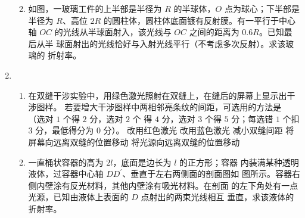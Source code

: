 \begin{enumerate}
\begin{enumerate}

\item 
如图，一玻璃工件的上半部是半径为 $ R $ 的半球体，$ O $ 点为球心；下半部是半径为
$ R $、高位 $ 2R $ 的圆柱体，圆柱体底面镀有反射膜。有一平行于中心轴 $ OC $
的光线从半球面射入，该光线与 $ OC $ 之间的距离为 $ 0.6R $。已知最后从半
球面射出的光线恰好与入射光线平行（不考虑多次反射）。求该玻璃的
折射率。
\begin{figure}[h!]
	\flushright
	
\end{figure}




\end{enumerate}


\item 
{}
\begin{enumerate}
	\item
在双缝干涉实验中，用绿色激光照射在双缝上，在缝后的屏幕上显示出干涉图样。
若要增大干涉图样中两相邻亮条纹的间距，可选用的方法是 \underlinegap （选对 $ 1 $ 个得 $ 2 $ 分，选对 $ 2 $ 个
得 $ 4 $ 分，选对 $ 3 $ 个得 $ 5 $ 分；每选错 $ 1 $ 个扣 $ 3 $ 分，最低得分为 $ 0 $ 分）。
\fivechoices
{改用红色激光}
{改用蓝色激光}
{减小双缝间距}
{将屏幕向远离双缝的位置移动}
{将光源向远离双缝的位置移动}



\item 
一直桶状容器的高为 $ 2l $，底面是边长为 $ l $ 的正方形；容器
内装满某种透明液体，过容器中心轴 $ DD ^{\prime} $、垂直于左右两侧面的剖面图如
图所示。容器右侧内壁涂有反光材料，其他内壁涂有吸光材料。在剖面
的左下角处有一点光源，已知由液体上表面的 $ D $ 点射出的两束光线相互
垂直，求该液体的折射率。
\begin{figure}[h!]
	\flushright
	
\end{figure}




\end{enumerate}




\end{enumerate}
